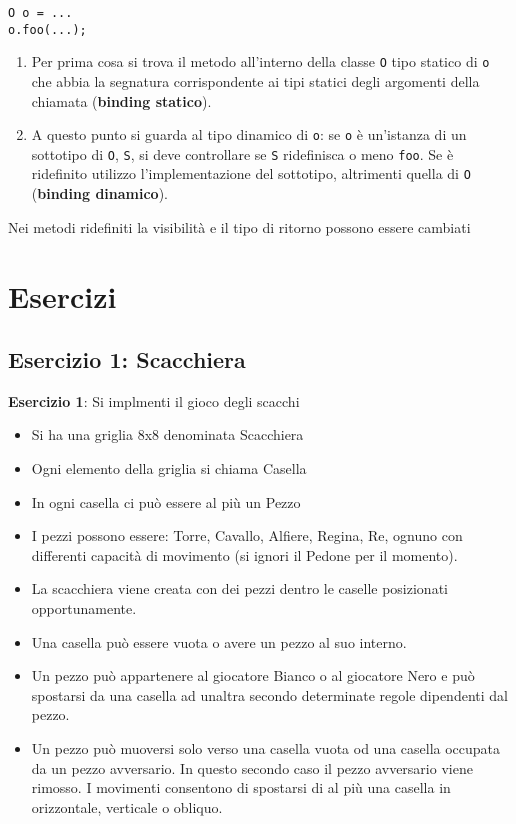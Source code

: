 \documentclass{article}
\begin{document}
\begin{lstlisting}
O o = ...
o.foo(...);
\end{lstlisting}

\begin{enumerate}
	\item Per prima cosa si trova il metodo all'interno della classe \texttt{O} tipo statico di \texttt{o} che abbia la segnatura corrispondente ai tipi statici degli argomenti della chiamata
	(\textbf{binding statico}).
	\item A questo punto si guarda al tipo dinamico di \texttt{o}: se 
	\texttt{o} è un'istanza di un sottotipo di \texttt{O}, \texttt{S}, si deve controllare
	se \texttt{S} ridefinisca o meno \texttt{foo}. Se è ridefinito utilizzo l'implementazione del
	sottotipo, altrimenti quella di \texttt{O} (\textbf{binding dinamico}).
\end{enumerate}

Nei metodi ridefiniti la visibilità e il tipo di ritorno possono essere cambiati







\section{Esercizi}

\subsection{Esercizio 1: Scacchiera}
\begin{framed}
\textbf{Esercizio 1}: Si implmenti il gioco degli scacchi
\begin{itemize}
\item Si ha una griglia 8x8 denominata Scacchiera
\item Ogni elemento della griglia si chiama Casella
\item  In ogni casella ci pu\`o essere al pi\`u un Pezzo
\item  I pezzi possono essere: Torre, Cavallo, Alfiere, Regina, Re, ognuno con differenti capacit\`a di movimento (si ignori il Pedone per il momento).
\item La scacchiera viene creata con dei pezzi dentro le caselle posizionati opportunamente.
\item  Una casella pu\`o essere vuota o avere un pezzo al suo interno.
\item Un pezzo pu\`o appartenere al giocatore Bianco o al giocatore Nero e pu\`o spostarsi da una casella ad unaltra secondo determinate regole dipendenti dal pezzo.
\item Un pezzo pu\`o muoversi solo verso una casella vuota od una casella occupata da un pezzo avversario. In questo secondo caso il pezzo avversario viene rimosso. I movimenti consentono di spostarsi di al pi\`u una casella in orizzontale, verticale o obliquo.
\end{itemize}
\end{framed}
\end{document}
